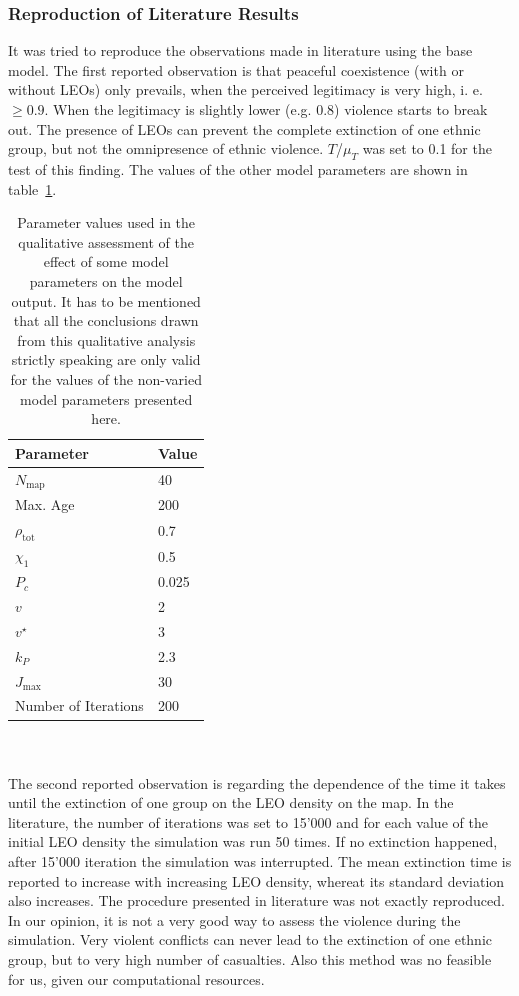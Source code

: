 \documentclass[11pt]{article}
\begin{document}
\subsubsection{Reproduction of Literature Results}
It was tried to reproduce the observations made in literature using the base model. The first reported observation is that peaceful coexistence (with or without LEOs) only prevails, when the perceived legitimacy is very high, i. e. $\geq 0.9$. When the legitimacy is slightly lower (e.g. 0.8) violence starts to break out. The presence of LEOs can prevent the complete extinction of one ethnic group, but not the omnipresence of ethnic violence. $T$/$\mu_T$ was set to 0.1 for the test of this finding. The values of the other model parameters are shown in table~\ref{tab:values_parameters}.
\begin{table}[!htbp]
	\centering
	\caption{Parameter values used in the qualitative assessment of the effect of some model parameters on the model output. It has to be mentioned that all the conclusions drawn from this qualitative analysis strictly speaking are only valid for the values of the non-varied model parameters presented here.}
	\vspace{0.5 cm}
		\begin{tabular}{l | l}
		Parameter & Value\\
		\hline
		$N_{\text{map}}$ & 40\\
		Max. Age & 200\\
		$\rho_{\text{tot}}$ & 0.7\\
		$\chi_1$ & 0.5\\
		$P_c$ & 0.025\\
		$v$ & 2\\
		$v^\star$ & 3\\
		$k_P$ & 2.3\\
		$J_{\text{max}}$ & 30\\
		Number of Iterations & 200\\
	\end{tabular}
	\label{tab:values_parameters}
\end{table}
\\
\\
The second reported observation is regarding the dependence of the time it takes until the extinction of one group on the LEO density on the map. In the literature, the number of iterations was set to 15'000 and for each value of the initial LEO density the simulation was run 50 times. If no extinction happened, after 15'000 iteration the simulation was interrupted. The mean extinction time is reported to increase with increasing LEO density, whereat its standard deviation also increases. The procedure presented in literature was not exactly reproduced. In our opinion, it is not a very good way to assess the violence during the simulation. Very violent conflicts can never lead to the extinction of one ethnic group, but to very high number of casualties. Also this method was no feasible for us, given our computational resources.\\
\end{document}
